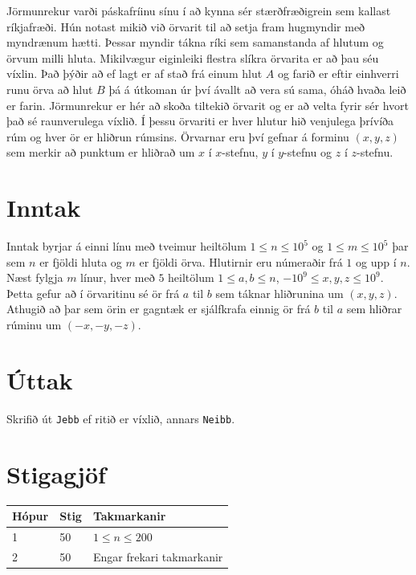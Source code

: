 
Jörmunrekur varði páskafríinu sínu í að kynna sér stærðfræðigrein sem kallast ríkjafræði. Hún notast mikið við
örvarit til að setja fram hugmyndir með myndrænum hætti. Þessar myndir tákna ríki sem samanstanda af hlutum og örvum
milli hluta. Mikilvægur eiginleiki flestra slíkra örvarita er að þau séu víxlin. Það þýðir að ef lagt er af stað frá
einum hlut $A$ og farið er eftir einhverri runu örva að hlut $B$ þá á útkoman úr því ávallt að vera sú sama, óháð hvaða
leið er farin. Jörmunrekur er hér að skoða tiltekið örvarit og er að velta fyrir sér hvort það sé raunverulega víxlið.
Í þessu örvariti er hver hlutur hið venjulega þrívíða rúm og hver ör er hliðrun rúmsins. Örvarnar
eru því gefnar á forminu $(x, y, z)$ sem merkir að punktum er hliðrað um $x$ í $x$-stefnu, $y$ í $y$-stefnu og $z$ í $z$-stefnu.

\section*{Inntak}
Inntak byrjar á einni línu með tveimur heiltölum $1 \leq n \leq 10^5$ og $1 \leq m \leq 10^5$ þar sem $n$ er fjöldi hluta og
$m$ er fjöldi örva. Hlutirnir eru númeraðir frá $1$ og upp í $n$. Næst fylgja $m$ línur, hver með $5$ heiltölum
$1 \leq a, b \leq n$, $-10^9 \leq x, y, z \leq 10^9$. Þetta gefur að í örvaritinu sé ör frá $a$ til $b$ sem
táknar hliðrunina um $(x, y, z)$. Athugið að þar sem örin er gagntæk er sjálfkrafa einnig ör frá $b$ til $a$ sem hliðrar
rúminu um $(-x, -y, -z)$.

\section*{Úttak}
Skrifið út \texttt{Jebb} ef ritið er víxlið, annars \texttt{Neibb}.

\section*{Stigagjöf}
\begin{tabular}{|l|l|l|}
\hline
Hópur & Stig & Takmarkanir \\ \hline
1 & 50 & $1 \leq n \leq 200$ \\ \hline
2 & 50 & Engar frekari takmarkanir \\ \hline
\end{tabular}

